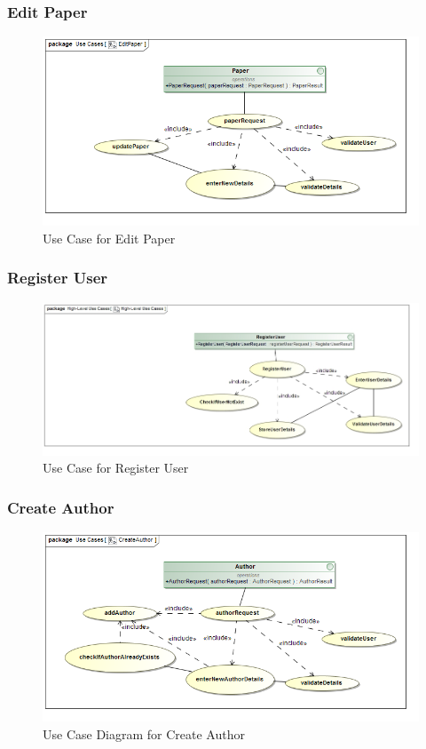 \documentclass[a4paper,10pt]{article}
\begin{document}
\subsubsection{Edit Paper}
	\begin{figure}[H]
		\includegraphics[scale=0.5]{Use_EditPaper}
	\caption{Use Case for Edit Paper}
	\end{figure}
	
\subsubsection{Register User}
	\begin{figure}[H]
		\includegraphics[scale=0.5]{UseRegisterUser}
	\caption{Use Case for Register User}
	\end{figure}

\subsubsection{Create Author}
	\begin{figure}[H]
		\includegraphics[scale=0.5]{Use_CreateAuthor}
		\caption{Use Case Diagram for Create Author}
	\end{figure}
	
\end{document}
